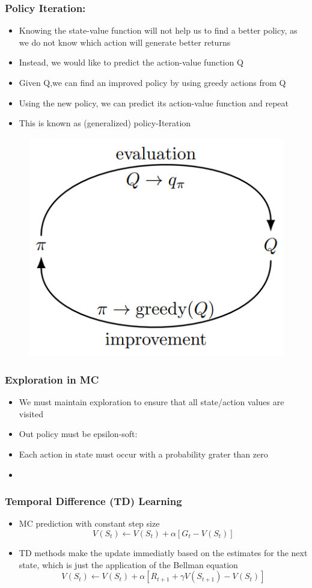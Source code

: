 \subsubsection*{Policy Iteration:}
\begin{itemize}
    \item Knowing the state-value function will not help us to find a better policy, as we do not know which action will generate better returns
    \item Instead, we would like to predict the action-value function Q
    \item Given Q,we can find an improved policy by using greedy actions from Q 
    \item Using the new policy, we can predict its action-value function and repeat
    \item This is known as (generalized) policy-Iteration
\end{itemize}
\begin{figure}[!h]
    \centering
    \includegraphics[width = 0.5\columnwidth]{figures/DeepReinforcementLearning1/PolicyIterationMonteCarlo.png}
\end{figure}

\subsubsection*{Exploration in MC}
\begin{itemize}
    \item We must maintain exploration to ensure that all state/action values are visited
    \item Out policy must be epsilon-soft:
    \item Each action in state must occur with a probability grater than zero
    \item 
\end{itemize}
\subsubsection{Temporal Difference (TD) Learning}
\begin{itemize}
    \item MC prediction with constant step size
    \[
    V(S_t) \leftarrow V(S_t) + \alpha[G_t - V(S_t)]
    \]

    \item TD methods make the update immediatly based on the estimates for the next state, which is just the application of the Bellman equation
    \[
    V(S_t) \leftarrow V(S_t) + \alpha[R_{t+1} + \gamma V(S_{t+1}) - V(S_t)]
    \]
\end{itemize}

